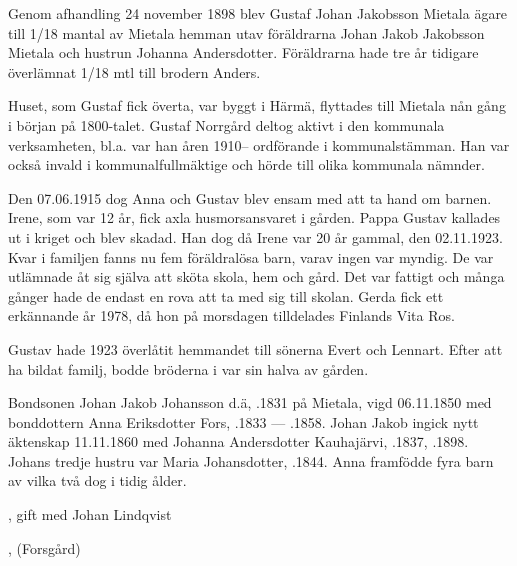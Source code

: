 Genom afhandling 24 november 1898 blev Gustaf Johan Jakobsson Mietala ägare till 1/18 mantal av Mietala hemman utav föräldrarna Johan Jakob Jakobsson Mietala och hustrun Johanna Andersdotter. Föräldrarna hade tre år tidigare överlämnat 1/18 mtl till brodern Anders.

Huset, som Gustaf fick överta, var byggt i Härmä, flyttades till Mietala nån gång i början på 1800-talet. Gustaf Norrgård deltog aktivt i den kommunala verksamheten, bl.a. var han åren 1910-- ordförande i kommunalstämman. Han var också invald i kommunalfullmäktige och hörde till olika kommunala nämnder.

Den 07.06.1915 dog Anna och Gustav blev ensam med att ta hand om barnen. Irene, som var 12 år, fick axla husmorsansvaret i gården. Pappa Gustav kallades ut i kriget och blev skadad. Han dog då Irene var 20 år gammal, den 02.11.1923. Kvar i familjen fanns nu fem föräldralösa barn, varav ingen var myndig. De var utlämnade åt sig själva att sköta skola, hem och gård. Det var fattigt och många gånger hade de endast en rova att ta med sig till skolan. Gerda fick ett erkännande år 1978, då hon på morsdagen tilldelades Finlands Vita Ros.

Gustav hade 1923 överlåtit hemmandet till sönerna Evert och Lennart. Efter att ha bildat familj, bodde bröderna i var sin halva av gården.


Bondsonen Johan Jakob Johansson d.ä, .1831 på Mietala, vigd 06.11.1850 med bonddottern Anna Eriksdotter Fors, .1833 --- .1858. Johan Jakob ingick nytt äktenskap 11.11.1860 med Johanna Andersdotter Kauhajärvi, .1837, .1898. Johans tredje hustru var Maria Johansdotter,  .1844.
Anna framfödde fyra barn av vilka två dog i tidig ålder.
\begin{jhchildren}
  \item {}, gift med Johan Lindqvist
  \item {}, (Forsgård)
  \item {}
  \item {}
\end{jhchildren}

